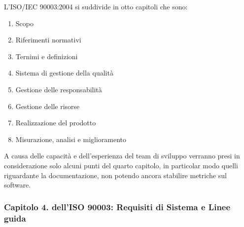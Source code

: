 	L'ISO/IEC 90003:2004 si suddivide in otto capitoli che sono:
	
	\begin{enumerate}
		\item Scopo
		\item Riferimenti normativi
		\item Ternimi e definizioni
		\item Sistema di gestione della qualità
		\item Gestione delle responsabilità
		\item Gestione delle risorse
		\item Realizzazione del prodotto
		\item Misurazione, analisi e miglioramento
	\end{enumerate}

	A causa delle capacità e dell'esperienza del team di sviluppo verranno presi in considerazione solo alcuni punti del quarto capitolo, in particolar modo quelli riguardante la documentazione, non potendo ancora stabilire metriche sul software.
	
	\subsubsection{Capitolo 4. dell'ISO 90003: Requisiti di Sistema e Linee guida}
	
